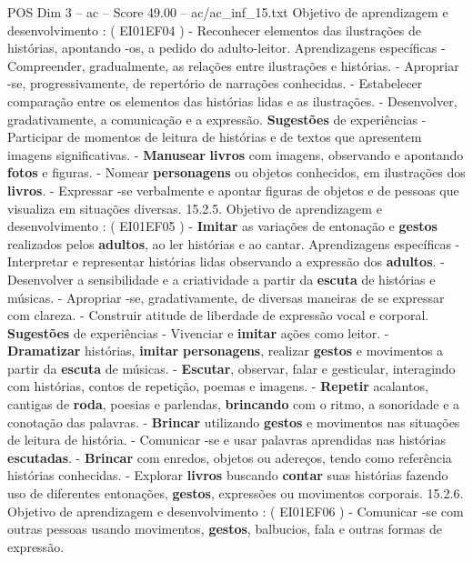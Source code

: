 \begin{textsample}{POS Dim 3 – ac – Score 49.00 – ac/ac\_inf\_15.txt}
Objetivo de aprendizagem e desenvolvimento : ( EI01EF04 ) - Reconhecer elementos das ilustrações de histórias, apontando -os, a pedido do adulto-leitor.
Aprendizagens específicas - Compreender, gradualmente, as relações entre ilustrações e histórias. - Apropriar -se, progressivamente, de repertório de narrações conhecidas. - Estabelecer comparação entre os elementos das histórias lidas e as ilustrações. - Desenvolver, gradativamente, a comunicação e a expressão. \textbf{Sugestões} de experiências - Participar de momentos de leitura de histórias e de textos que apresentem imagens significativas. - \textbf{Manusear} \textbf{livros} com imagens, observando e apontando \textbf{fotos} e figuras. - Nomear \textbf{personagens} ou objetos conhecidos, em ilustrações dos \textbf{livros}. - Expressar -se verbalmente e apontar figuras de objetos e de pessoas que visualiza em situações diversas. 15.2.5.
Objetivo de aprendizagem e desenvolvimento : ( EI01EF05 ) - \textbf{Imitar} as variações de entonação e \textbf{gestos} realizados pelos \textbf{adultos}, ao ler histórias e ao cantar.
Aprendizagens específicas - Interpretar e representar histórias lidas observando a expressão dos \textbf{adultos}. - Desenvolver a sensibilidade e a criatividade a partir da \textbf{escuta} de histórias e músicas. - Apropriar -se, gradativamente, de diversas maneiras de se expressar com clareza. - Construir atitude de liberdade de expressão vocal e corporal. \textbf{Sugestões} de experiências - Vivenciar e \textbf{imitar} ações como leitor. - \textbf{Dramatizar} histórias, \textbf{imitar} \textbf{personagens}, realizar \textbf{gestos} e movimentos a partir da \textbf{escuta} de músicas. - \textbf{Escutar}, observar, falar e gesticular, interagindo com histórias, contos de repetição, poemas e imagens. - \textbf{Repetir} acalantos, cantigas de \textbf{roda}, poesias e parlendas, \textbf{brincando} com o ritmo, a sonoridade e a conotação das palavras. - \textbf{Brincar} utilizando \textbf{gestos} e movimentos nas situações de leitura de história. - Comunicar -se e usar palavras aprendidas nas histórias \textbf{escutadas}. - \textbf{Brincar} com enredos, objetos ou adereços, tendo como referência histórias conhecidas. - Explorar \textbf{livros} buscando \textbf{contar} suas histórias fazendo uso de diferentes entonações, \textbf{gestos}, expressões ou movimentos corporais. 15.2.6.
Objetivo de aprendizagem e desenvolvimento : ( EI01EF06 ) - Comunicar -se com outras pessoas usando movimentos, \textbf{gestos}, balbucios, fala e outras formas de expressão.

\end{textsample}
